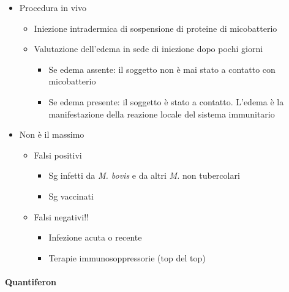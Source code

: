 \documentclass[italian,]{article}
\providecommand{\tightlist}{%
  \setlength{\itemsep}{0pt}\setlength{\parskip}{0pt}}
\begin{document}
\begin{itemize}
\tightlist
\item
  Procedura in vivo

  \begin{itemize}
  \tightlist
  \item
    Iniezione intradermica di sospensione di proteine di micobatterio
  \item
    Valutazione dell'edema in sede di iniezione dopo pochi giorni

    \begin{itemize}
    \tightlist
    \item
      Se edema assente: il soggetto non è mai stato a contatto con
      micobatterio
    \item
      Se edema presente: il soggetto è stato a contatto. L'edema è la
      manifestazione della reazione locale del sistema immunitario
    \end{itemize}
  \end{itemize}
\item
  Non è il massimo

  \begin{itemize}
  \tightlist
  \item
    Falsi positivi

    \begin{itemize}
    \tightlist
    \item
      Sg infetti da \emph{M. bovis} e da altri \emph{M.} non tubercolari
    \item
      Sg vaccinati
    \end{itemize}
  \item
    Falsi negativi!!

    \begin{itemize}
    \tightlist
    \item
      Infezione acuta o recente
    \item
      Terapie immunosoppressorie (top del top)
    \end{itemize}
  \end{itemize}
\end{itemize}

\hypertarget{quantiferon}{%
\paragraph{Quantiferon}\label{quantiferon}}
\end{document}
